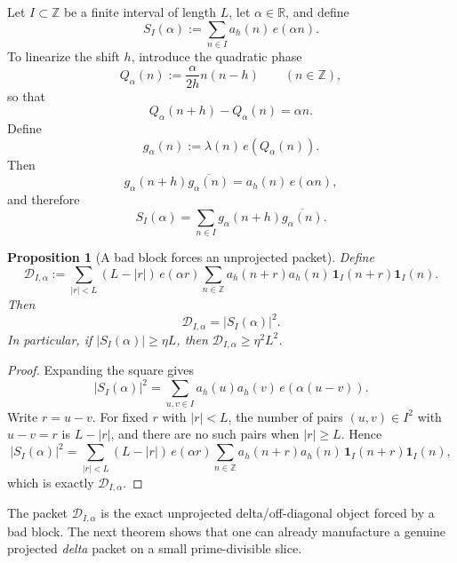 \documentclass[11pt]{scrartcl}
\numberwithin{equation}{section}
\newtheorem{proposition}[theorem]{Proposition}
\theoremstyle{definition}
\newcommand{\Z}{\mathbb Z}
\newcommand{\R}{\mathbb R}
\newcommand{\1}{\mathbf 1}
\newcommand{\ee}[1]{e\!\left(#1\right)}
\begin{document}
Let $I\subset\Z$ be a finite interval of length $L$, let $\alpha\in\R$, and define
\[
S_I(\alpha):=\sum_{n\in I}a_h(n)\,\ee{\alpha n}.
\]
To linearize the shift $h$, introduce the quadratic phase
\[
Q_\alpha(n):=\frac{\alpha}{2h}n(n-h)
\qquad (n\in\Z),
\]
so that
\[
Q_\alpha(n+h)-Q_\alpha(n)=\alpha n.
\]
Define
\[
g_\alpha(n):=\lambda(n)\,\ee{Q_\alpha(n)}.
\]
Then
\[
g_\alpha(n+h)\overline{g_\alpha(n)}=a_h(n)\,\ee{\alpha n},
\]
and therefore
\[
S_I(\alpha)=\sum_{n\in I}g_\alpha(n+h)\overline{g_\alpha(n)}.
\]

\begin{proposition}[A bad block forces an unprojected packet]
\label{prop:bad-block-packet}
Define
\[
\mathcal D_{I,\alpha}
:=
\sum_{|r|<L}(L-|r|)\,\ee{\alpha r}
\sum_{n\in\Z}a_h(n+r)a_h(n)\,\mathbf 1_I(n+r)\mathbf 1_I(n).
\]
Then
\[
\mathcal D_{I,\alpha}=|S_I(\alpha)|^2.
\]
In particular, if $|S_I(\alpha)|\ge \eta L$, then $\mathcal D_{I,\alpha}\ge \eta^2L^2$.
\end{proposition}

\begin{proof}
Expanding the square gives
\[
|S_I(\alpha)|^2
=
\sum_{u,v\in I}a_h(u)a_h(v)\,\ee{\alpha(u-v)}.
\]
Write $r=u-v$. For fixed $r$ with $|r|<L$, the number of pairs $(u,v)\in I^2$ with $u-v=r$ is $L-|r|$, and there are no such pairs when $|r|\ge L$. Hence
\[
|S_I(\alpha)|^2
=
\sum_{|r|<L}(L-|r|)\,\ee{\alpha r}
\sum_{n\in\Z}a_h(n+r)a_h(n)\,\mathbf 1_I(n+r)\mathbf 1_I(n),
\]
which is exactly $\mathcal D_{I,\alpha}$.
\end{proof}

The packet $\mathcal D_{I,\alpha}$ is the exact unprojected delta/off-diagonal object forced by a bad block.
The next theorem shows that one can already manufacture a genuine projected \emph{delta} packet on a small prime-divisible slice.
\end{document}
